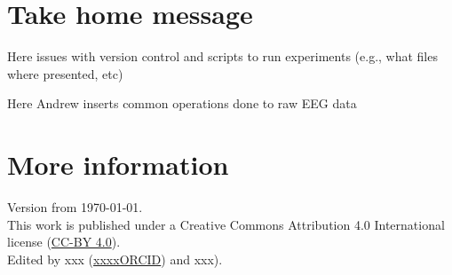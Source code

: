 \documentclass[a4paper,11pt]{report}
\begin{document}
\section*{Take home message} 



\begin{tcolorbox}[enhanced,fit to height=10cm,
  colback=linkgreen!85!black!10!white,colframe=linkgreen!75!black,title= \Large Technical Box 1 - Archiving scripts for stimuli presentation ,
  drop fuzzy shadow,watermark color=white,watermark text=CRS]
  
Here issues with version control and scripts to run experiments (e.g., what files where presented, etc)   
\end{tcolorbox}

\begin{tcolorbox}[enhanced,fit to height=10cm,
  colback=linkgreen!85!black!10!white,colframe=linkgreen!75!black,title= \Large Technical Box 2 - Challenges of EEG experiments ,
  drop fuzzy shadow,watermark color=white,watermark text=CRS]

  Here Andrew inserts common operations done to raw EEG data 
\end{tcolorbox}


\section*{More information}




\vfill
\scriptsize
Version from \today. \\
This work is published under a Creative Commons Attribution 4.0 International license
(\href{https://creativecommons.org/licenses/by/4.0/}{CC-BY 4.0}). \\
Edited by xxx (\href{https://orcid.org/0000-0003-2779-320X}{xxxxORCID}) and 
xxx). \\
\end{document}
